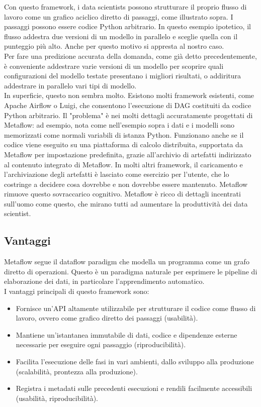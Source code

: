 \documentclass[12pt,a4paper]{report}
\begin{document}
Con questo framework, i data scientists possono strutturare il proprio flusso di lavoro come un grafico aciclico diretto di passaggi, come illustrato sopra. I passaggi possono essere codice Python arbitrario. In questo esempio ipotetico, il flusso addestra due versioni di un modello in parallelo e sceglie quella con il punteggio più alto. Anche per questo motivo si appresta al nostro caso.\\
Per fare una predizione accurata della domanda, come già detto precedentemente, è conveniente addestrare varie versioni di un modello per scoprire quali configurazioni del modello testate presentano i migliori risultati, o addiritura addestrare in parallelo vari tipi di modello.\\
In superficie, questo non sembra molto. Esistono molti framework esistenti, come Apache Airflow o Luigi, che consentono l'esecuzione di DAG costituiti da codice Python arbitrario. Il "problema" è nei molti dettagli accuratamente progettati di Metaflow: ad esempio, nota come nell'esempio sopra i dati e i modelli sono memorizzati come normali variabili di istanza Python. Funzionano anche se il codice viene eseguito su una piattaforma di calcolo distribuita, supportata da Metaflow per impostazione predefinita, grazie all'archivio di artefatti indirizzato al contenuto integrato di Metaflow. In molti altri framework, il caricamento e l'archiviazione degli artefatti è lasciato come esercizio per l'utente, che lo costringe a decidere cosa dovrebbe e non dovrebbe essere mantenuto. Metaflow rimuove questo sovraccarico cognitivo.
Metaflow è ricco di dettagli incentrati sull'uomo come questo, che mirano tutti ad aumentare la produttività dei data scientist.\\

\subsection{Vantaggi}
Metaflow segue il dataflow paradigm che modella un programma come un grafo diretto di operazioni. Questo è un paradigma naturale per esprimere le pipeline di elaborazione dei dati, in particolare l'apprendimento automatico.\\
I vantaggi principali di questo framework sono: \cite{MetaFLow}
\begin{itemize}
    \item Fornisce un'API altamente utilizzabile per strutturare il codice come flusso di lavoro, ovvero come grafico diretto dei passaggi (usabilità).
    \item Mantiene un'istantanea immutabile di dati, codice e dipendenze esterne necessarie per eseguire ogni passaggio (riproducibilità).
    \item Facilita l'esecuzione delle fasi in vari ambienti, dallo sviluppo alla produzione (scalabilità, prontezza alla produzione).
    \item Registra i metadati sulle precedenti esecuzioni e rendili facilmente accessibili (usabilità, riproducibilità).
\end{itemize}
\end{document}
